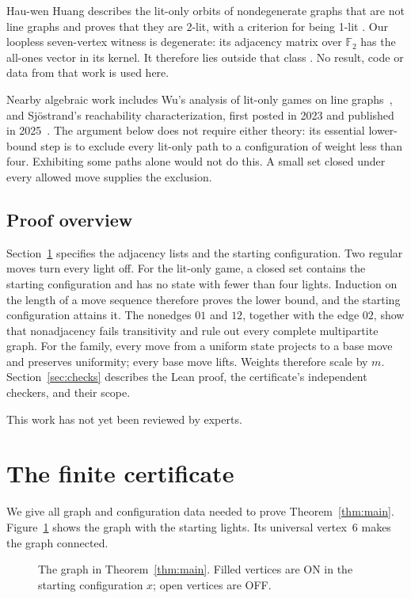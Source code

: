 \documentclass[11pt]{article}
\begin{document}
Hau-wen Huang describes the lit-only orbits of nondegenerate graphs that
are not line graphs and proves that they are 2-lit, with a criterion for
being 1-lit \cite[Theorems~3.1 and~3.2]{Huang}. Our loopless seven-vertex
witness is degenerate: its adjacency matrix over $\mathbb F_2$ has the
all-ones vector in its kernel. It therefore lies outside that class
\cite[Lemma~2.1]{Huang}. No result, code or data from that work is used here.

Nearby algebraic work includes Wu's analysis of lit-only games on line
graphs~\cite{Wu}, and Sj\"ostrand's reachability characterization,
first posted in 2023 and
published in 2025~\cite{Sjostrand}. The argument below does not require
either theory: its essential lower-bound step is to exclude every
lit-only path to a configuration of weight less than four. Exhibiting
some paths alone would not do this. A small set closed under every
allowed move supplies the exclusion.

\subsection*{Proof overview}
Section~\ref{sec:proof} specifies the adjacency lists and the starting
configuration. Two regular moves turn every light off. For the lit-only
game, a closed set contains the starting configuration and has no state
with fewer than four lights. Induction on the length of a move sequence
therefore proves the lower bound, and the starting configuration attains
it. The nonedges $01$ and $12$, together with the edge $02$, show that
nonadjacency fails transitivity and rule out every complete multipartite
graph. For the family, every move from a uniform state projects to a base
move and preserves uniformity; every base move lifts. Weights therefore
scale by $m$. Section~\ref{sec:checks} describes the
Lean proof, the certificate's independent checkers, and their scope.

This work has not yet been reviewed by experts.

\section{The finite certificate}\label{sec:proof}
We give all graph and configuration data needed to prove
Theorem~\ref{thm:main}. Figure~\ref{fig:graph} shows the graph with the
starting lights. Its universal vertex~$6$ makes the graph connected.

\begin{figure}[ht]
\centering

\caption{The graph in Theorem~\ref{thm:main}. Filled vertices are ON in
the starting configuration $x$; open vertices are OFF.}
\label{fig:graph}
\end{figure}
\end{document}
